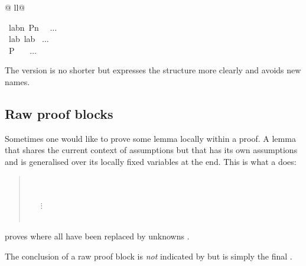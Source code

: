 \begin{isabellebody}
\begin{tabular}{@ {}ll@ {}}
\begin{minipage}[t]{.4\textwidth}
{\isamarkupfalse%
\ lab\isactrlisub n{}\ {}P\isactrlisub n{}\ %
\ $\dots$\\
\isamarkupfalse%
\ lab\ lab%
\ $\dots$\\
\isamarkupfalse%
\ {}P{}\ \ %
\ $\dots$\\
%
\endisatagproof
{\isafoldproof}%
%
\isadelimproof
%
\endisadelimproof
%
}
\end{minipage}
\end{tabular}
\begin{isamarkuptext}%
The  version is no shorter but expresses the structure more
clearly and avoids new names.

\subsection{Raw proof blocks}

Sometimes one would like to prove some lemma locally within a proof.
A lemma that shares the current context of assumptions but that
has its own assumptions and is generalised over its locally fixed
variables at the end. This is what a  does:
\begin{quote}
  \\
\mbox{}\ \ \  \\
\mbox{}\ \ \ $\vdots$\\
\mbox{}\ \ \  \\
\end{quote}
proves 
where all  have been replaced by unknowns .
\begin{warn}
The conclusion of a raw proof block is \emph{not} indicated by 
but is simply the final .
\end{warn}


\end{isamarkuptext}
\end{isabellebody}
